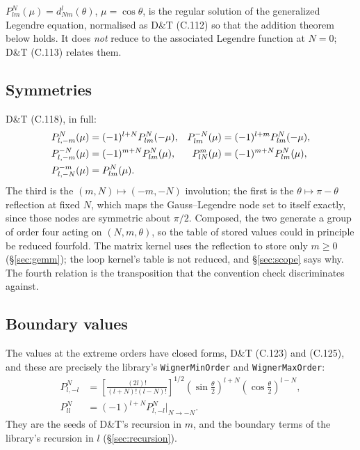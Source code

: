 \documentclass[11pt,a4paper]{article}
\newcommand{\code}[1]{\texttt{#1}}
\begin{document}
$P^N_{lm}(\mu)=d^l_{Nm}(\theta)$, $\mu=\cos\theta$, is the regular
solution of the generalized Legendre equation, normalised as D\&T (C.112)
so that the addition theorem below holds.  It does \emph{not} reduce to
the associated Legendre function at $N=0$; D\&T (C.113) relates them.

\subsection{Symmetries}

D\&T (C.118), in full:
\begin{align}
  P^{N}_{l,-m}(\mu) &= (-1)^{l+N} P^{N}_{lm}(-\mu), &
  P^{-N}_{lm}(\mu)  &= (-1)^{l+m} P^{N}_{lm}(-\mu), \notag \\
  P^{-N}_{l,-m}(\mu) &= (-1)^{m+N} P^{N}_{lm}(\mu), &
  P^{m}_{lN}(\mu)   &= (-1)^{m+N} P^{N}_{lm}(\mu),
  \label{eq:symmetries}\\
  P^{-m}_{l,-N}(\mu) &= P^{N}_{lm}(\mu). \notag
\end{align}
The third is the $(m,N)\mapsto(-m,-N)$ involution; the first is the
$\theta\mapsto\pi-\theta$ reflection at fixed $N$, which maps the
Gauss--Legendre node set to itself exactly, since those nodes are
symmetric about $\pi/2$.  Composed, the two generate a group of order four
acting on $(N,m,\theta)$, so the table of stored values could in principle
be reduced fourfold.  The matrix kernel uses the reflection to store only
$m\geq 0$ (\S\ref{sec:gemm}); the loop kernel's table is not reduced, and
\S\ref{sec:scope} says why.  The fourth relation is the transposition that
the convention check discriminates against.

\subsection{Boundary values}

The values at the extreme orders have closed forms, D\&T (C.123) and
(C.125), and these are precisely the library's
\code{WignerMinOrder} and \code{WignerMaxOrder}:
\begin{align}
  P^{N}_{l,-l} &= \left[\frac{(2l)!}{(l+N)!(l-N)!}\right]^{1/2}
                  \left(\sin\tfrac{\theta}{2}\right)^{l+N}
                  \left(\cos\tfrac{\theta}{2}\right)^{l-N},
  \label{eq:minorder}\\
  P^{N}_{ll}   &= (-1)^{l+N} P^{N}_{l,-l}\big|_{N\to-N}.
  \label{eq:maxorder}
\end{align}
They are the seeds of D\&T's recursion in $m$, and the boundary terms of
the library's recursion in $l$ (\S\ref{sec:recursion}).
\end{document}
